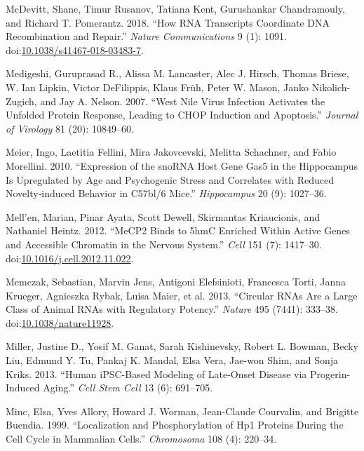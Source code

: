 \documentclass[onehalf,12pt]{beavtex}
\begin{document}
  \hypertarget{ref-McDevittHowRNAtranscripts2018}{}
  McDevitt, Shane, Timur Rusanov, Tatiana Kent, Gurushankar Chandramouly,
  and Richard T. Pomerantz. 2018. ``How RNA Transcripts Coordinate DNA
  Recombination and Repair.'' \emph{Nature Communications} 9 (1): 1091.
  doi:\href{https://doi.org/10.1038/s41467-018-03483-7}{10.1038/s41467-018-03483-7}.
  
  \hypertarget{ref-MedigeshiWestNilevirus2007}{}
  Medigeshi, Guruprasad R., Alissa M. Lancaster, Alec J. Hirsch, Thomas
  Briese, W. Ian Lipkin, Victor DeFilippis, Klaus Früh, Peter W. Mason,
  Janko Nikolich-Zugich, and Jay A. Nelson. 2007. ``West Nile Virus
  Infection Activates the Unfolded Protein Response, Leading to CHOP
  Induction and Apoptosis.'' \emph{Journal of Virology} 81 (20):
  10849--60.
  
  \hypertarget{ref-MeierExpressionsnoRNAhost2010}{}
  Meier, Ingo, Laetitia Fellini, Mira Jakovcevski, Melitta Schachner, and
  Fabio Morellini. 2010. ``Expression of the snoRNA Host Gene Gas5 in the
  Hippocampus Is Upregulated by Age and Psychogenic Stress and Correlates
  with Reduced Novelty‐induced Behavior in C57bl/6 Mice.''
  \emph{Hippocampus} 20 (9): 1027--36.
  
  \hypertarget{ref-MellenMeCP2Binds5hmC2012}{}
  Mell\a'en, Marian, Pinar Ayata, Scott Dewell, Skirmantas Kriaucionis,
  and Nathaniel Heintz. 2012. ``MeCP2 Binds to 5hmC Enriched Within Active
  Genes and Accessible Chromatin in the Nervous System.'' \emph{Cell} 151
  (7): 1417--30.
  doi:\href{https://doi.org/10.1016/j.cell.2012.11.022}{10.1016/j.cell.2012.11.022}.
  
  \hypertarget{ref-MemczakCircularRNAsare2013}{}
  Memczak, Sebastian, Marvin Jens, Antigoni Elefsinioti, Francesca Torti,
  Janna Krueger, Agnieszka Rybak, Luisa Maier, et al. 2013. ``Circular
  RNAs Are a Large Class of Animal RNAs with Regulatory Potency.''
  \emph{Nature} 495 (7441): 333--38.
  doi:\href{https://doi.org/10.1038/nature11928}{10.1038/nature11928}.
  
  \hypertarget{ref-MillerHumaniPSCbasedmodeling2013}{}
  Miller, Justine D., Yosif M. Ganat, Sarah Kishinevsky, Robert L. Bowman,
  Becky Liu, Edmund Y. Tu, Pankaj K. Mandal, Elsa Vera, Jae-won Shim, and
  Sonja Kriks. 2013. ``Human iPSC-Based Modeling of Late-Onset Disease via
  Progerin-Induced Aging.'' \emph{Cell Stem Cell} 13 (6): 691--705.
  
  \hypertarget{ref-MincLocalizationphosphorylationHP11999}{}
  Minc, Elsa, Yves Allory, Howard J. Worman, Jean-Claude Courvalin, and
  Brigitte Buendia. 1999. ``Localization and Phosphorylation of Hp1
  Proteins During the Cell Cycle in Mammalian Cells.'' \emph{Chromosoma}
  108 (4): 220--34.
  
\end{document}

